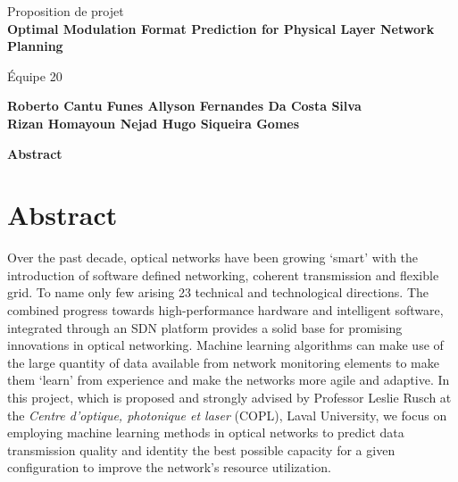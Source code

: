 \documentclass[letterpaper,titlepage,11pt]{article}
\begin{document}
\thispagestyle{plain}
\begin{center}
    \Large
    Proposition de projet\\
    \textbf{Optimal Modulation Format Prediction for Physical Layer Network Planning}
 
    \vspace{0.4cm}
    \large
    Équipe 20
 
    \vspace{0.4cm}
    \textbf{Roberto Cantu Funes \qquad Allyson Fernandes Da Costa Silva}\\
    \textbf{Rizan Homayoun Nejad \qquad Hugo Siqueira Gomes}
 
    \vspace{0.9cm}
    \textbf{Abstract}
\end{center}

\section{Abstract}
Over the past decade, optical networks have been growing ‘smart’ with the introduction of software defined networking, coherent transmission and flexible grid. To name only few arising 23 technical and technological directions. The combined progress towards high-performance hardware and intelligent software, integrated through an SDN platform provides a solid base for promising innovations in optical networking. Machine learning algorithms can make use of the large quantity of data available from network monitoring elements to make them ‘learn’ from experience and make the networks more agile and adaptive. In this project, which is proposed and strongly advised by Professor Leslie Rusch at the \textit{Centre d'optique, photonique et laser} (COPL), Laval University, we focus on employing machine learning methods in optical networks to predict data transmission quality and identity the best possible capacity for a given configuration to improve the network's resource utilization.
\end{document}
